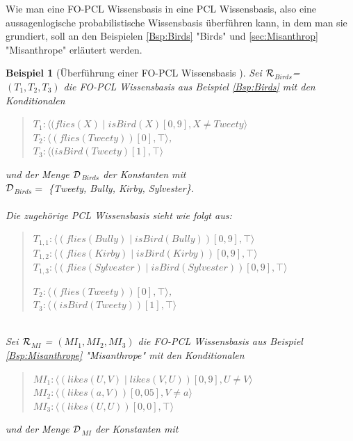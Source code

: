 \documentclass[a4paper, 11pt]{book}
\newtheorem{Bsp}{Beispiel}[section]
\begin{document}
	Wie man eine FO-PCL Wissensbasis in eine PCL Wissensbasis, also eine aussagenlogische probabilistische Wissensbasis überführen kann, in dem man sie grundiert, soll an den Beispielen  \ref{Bsp:Birds} "{}Birds"{} und \ref{sec:Misanthrop} "{}Misanthrope"{}  erläutert werden.
\begin{Bsp}[Überführung einer FO-PCL Wissensbasis ]

	Sei $ \cal{R} $$_{Birds} $= \\ $ (T_1, T_2, T_3)  $ die FO-PCL Wissensbasis aus Beispiel  \ref{Bsp:Birds} mit den Konditionalen 
	\begin{quote}
	$ T_{1} : \langle (flies(X) \mid isBird(X)[0,9], X \neq Tweety \rangle$\\
	$ T_{2}  :  \langle (flies(Tweety))[0], \top \rangle $,\\
	$ T_{3} : \langle (isBird(Tweety) [1], \top \rangle$\\

	\end{quote}
	und der Menge $ \cal{D} $$_{Birds}  $ der Konstanten mit\\
	$ \cal{D} $$_{Birds} = $ \{Tweety, Bully, Kirby, Sylvester\}. \\
	\\
	Die zugehörige PCL Wissensbasis sieht wie folgt aus:
	\begin{quote}
	$ T_{1,1} : \langle (flies(Bully) \mid isBird(Bully))[0,9], \top \rangle$\\
	$ T_{1,2} : \langle (flies(Kirby) \mid isBird(Kirby))[0,9], \top \rangle$\\
	$ T_{1,3} : \langle (flies(Sylvester) \mid isBird(Sylvester))[0,9], \top \rangle$
		
	$ T_{2}  :  \langle (flies(Tweety))[0], \top \rangle $,\\
	$ T_{3} : \langle (isBird(Tweety))[1], \top \rangle$\\

	\end{quote}
	\noindent
	\\
	Sei $ \cal{R} $$_{MI} $ = $ (MI_1, MI_2, MI_3)  $ die FO-PCL Wissensbasis aus Beispiel \ref{Bsp:Misanthrope} "{}Misanthrope"{} mit den Konditionalen 
	\begin{quote}
	$ MI_1 : \langle (likes(U, V) \mid likes(V, U))[0,9], U \neq V \rangle$\\
	$ MI_2 : \langle (likes(a, V))[0,05], V \neq a \rangle$\\
	$ MI_{3} : \langle (likes(U, U))[0,0], \top \rangle$\\
	\end{quote}
	und der Menge $ \cal{D} $$_{MI}  $ der Konstanten mit
	

\end{Bsp}
\end{document}
